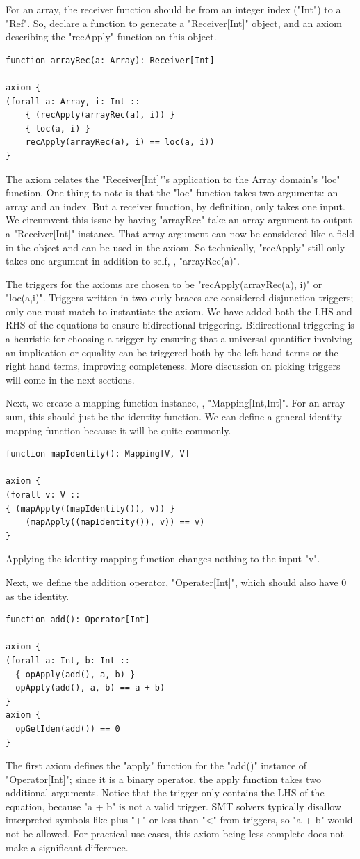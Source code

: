 \documentclass[msc,oneside]{ubcthesis}
\theoremstyle{definition}
\begin{document}
For an array, the receiver function should be from an integer index ("Int") to a "Ref". So, declare a function to generate a "Receiver[Int]" object, and an axiom describing the "recApply" function on this object.
\begin{lstlisting}
function arrayRec(a: Array): Receiver[Int] 

axiom {
(forall a: Array, i: Int ::
    { (recApply(arrayRec(a), i)) }
    { loc(a, i) }
    recApply(arrayRec(a), i) == loc(a, i))
}
\end{lstlisting}
The axiom relates the "Receiver[Int]"'s application to the Array domain's "loc" function. One thing to note is that the "loc" function takes two arguments: an array and an index. But a receiver function, by definition, only takes one input. We circumvent this issue by having "arrayRec" take an array argument to output a "Receiver[Int]" instance. That array argument can now be considered like a field in the object and can be used in the axiom. So technically, "recApply" still only takes one argument in addition to self, \ie, "arrayRec(a)".

The triggers for the axioms are chosen to be "recApply(arrayRec(a), i)" or "loc(a,i)". Triggers written in two curly braces are considered disjunction triggers; only one must match to instantiate the axiom. We have added both the LHS and RHS of the equations to ensure bidirectional triggering. Bidirectional triggering is a heuristic for choosing a trigger by ensuring that a universal quantifier involving an implication or equality can be triggered both by the left hand terms or the right hand terms, improving completeness. More discussion on picking triggers will come in the next sections.

Next, we create a mapping function instance, \ie, "Mapping[Int,Int]". For an array sum, this should just be the identity function. We can define a general identity mapping function because it will be quite commonly.
\begin{lstlisting}
function mapIdentity(): Mapping[V, V] 
  
axiom {
(forall v: V ::
{ (mapApply((mapIdentity()), v)) }
    (mapApply((mapIdentity()), v)) == v)
}
\end{lstlisting}
Applying the identity mapping function changes nothing to the input "v".

Next, we define the addition operator, "Operater[Int]", which should also have 0 as the identity.
\begin{lstlisting}
function add(): Operator[Int] 
  
axiom {
(forall a: Int, b: Int ::
  { opApply(add(), a, b) }
  opApply(add(), a, b) == a + b)
}
axiom {
  opGetIden(add()) == 0
}
\end{lstlisting}
The first axiom defines the "apply" function for the "add()" instance of "Operator[Int]"; since it is a binary operator, the apply function takes two additional arguments. Notice that the trigger only contains the LHS of the equation, because "a + b" is not a valid trigger. SMT solvers typically disallow interpreted symbols like plus "+" or less than "<" from triggers, so "a + b" would not be allowed. For practical use cases, this axiom being less complete does not make a significant difference.
\end{document}
